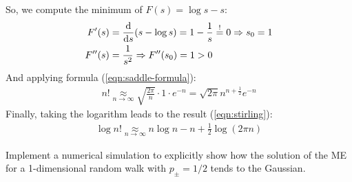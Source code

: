 \documentclass[../template.tex]{subfiles}
\begin{document}
\begin{exo}
    So, we compute the minimum of $F(s) = \log s - s$:
    \begin{align*}
        F'(s) &= \dv{s} (s - \log s) = 1 - \frac{1}{s} \overset{!}{=} 0 \Rightarrow s_0 = 1\\
        F''(s) &= \frac{1}{s^2} \Rightarrow F''(s_0) = 1 > 0 
    \end{align*}
    And applying formula (\ref{eqn:saddle-formula}):
    \begin{align*}
        n! \underset{n \to \infty}{\approx} \sqrt{\frac{2\pi}{n} } \cdot 1 \cdot e^{-n} = \sqrt{2 \pi} n^{n+\frac{1}{2}} e^{-n}  
    \end{align*}
    Finally, taking the logarithm leads to the result (\ref{eqn:stirling}):
    \begin{align*}
        \log n! \underset{n \to \infty}{\approx} n \log n -n +\frac{1}{2} \log (2 \pi n) 
    \end{align*}
\end{exo}

\begin{exo}
    Implement a numerical simulation to explicitly show how the solution of the ME for a 1-dimensional random walk with $p_\pm = 1/2$ tends to the Gaussian. 
\end{exo}
\end{document}
